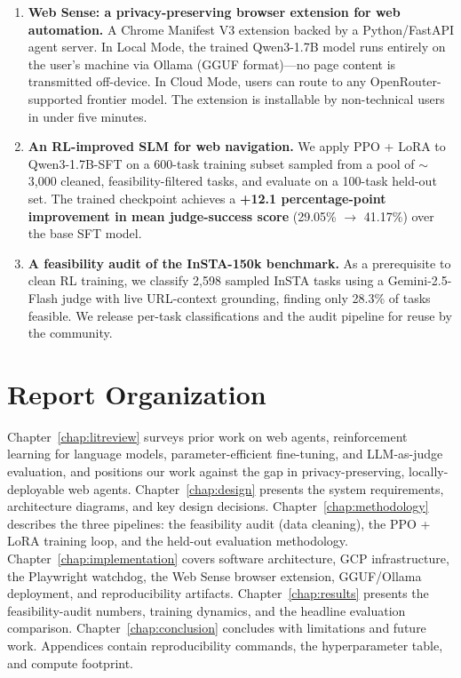 \documentclass[12pt,a4paper]{report}
\begin{document}
\begin{enumerate}
  \item \textbf{Web Sense: a privacy-preserving browser extension for web automation.} A Chrome Manifest V3 extension backed by a Python/FastAPI agent server. In Local Mode, the trained Qwen3-1.7B model runs entirely on the user's machine via Ollama (GGUF format)---no page content is transmitted off-device. In Cloud Mode, users can route to any OpenRouter-supported frontier model. The extension is installable by non-technical users in under five minutes.
  \item \textbf{An RL-improved SLM for web navigation.} We apply PPO + LoRA to Qwen3-1.7B-SFT on a 600-task training subset sampled from a pool of $\sim$3{,}000 cleaned, feasibility-filtered tasks, and evaluate on a 100-task held-out set. The trained checkpoint achieves a \textbf{+12.1 percentage-point improvement in mean judge-success score} (29.05\% $\to$ 41.17\%) over the base SFT model.
  \item \textbf{A feasibility audit of the InSTA-150k benchmark.} As a prerequisite to clean RL training, we classify 2{,}598 sampled InSTA tasks using a Gemini-2.5-Flash judge with live URL-context grounding, finding only 28.3\% of tasks feasible. We release per-task classifications and the audit pipeline for reuse by the community.
\end{enumerate}

\section{Report Organization}

Chapter~\ref{chap:litreview} surveys prior work on web agents, reinforcement learning for language models, parameter-efficient fine-tuning, and LLM-as-judge evaluation, and positions our work against the gap in privacy-preserving, locally-deployable web agents. Chapter~\ref{chap:design} presents the system requirements, architecture diagrams, and key design decisions. Chapter~\ref{chap:methodology} describes the three pipelines: the feasibility audit (data cleaning), the PPO + LoRA training loop, and the held-out evaluation methodology. Chapter~\ref{chap:implementation} covers software architecture, GCP infrastructure, the Playwright watchdog, the Web Sense browser extension, GGUF/Ollama deployment, and reproducibility artifacts. Chapter~\ref{chap:results} presents the feasibility-audit numbers, training dynamics, and the headline evaluation comparison. Chapter~\ref{chap:conclusion} concludes with limitations and future work. Appendices contain reproducibility commands, the hyperparameter table, and compute footprint.
\end{document}
